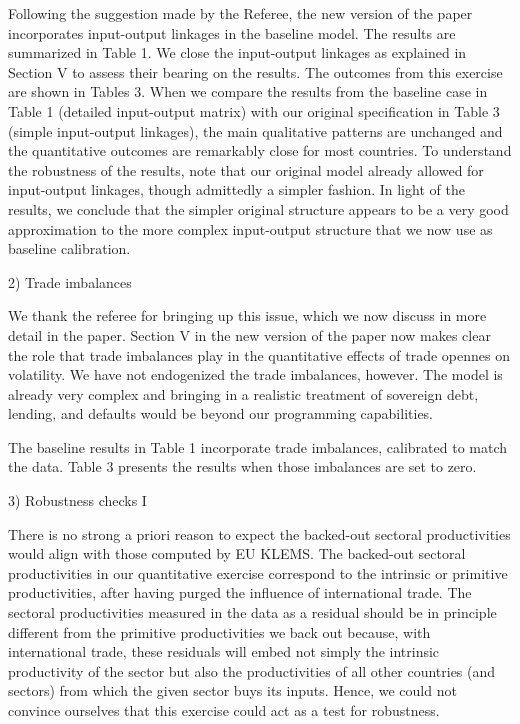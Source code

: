 \documentclass[12pt]{article}
\begin{document}
Following the suggestion made by the Referee, the new version of the paper
incorporates input-output linkages in the baseline model. The results are
summarized in Table 1. We close the input-output linkages as explained in
Section V to assess their bearing on the results. The outcomes from this
exercise are shown in Tables 3. When we compare the results from the
baseline case in Table 1 (detailed input-output matrix) with our original
specification in Table 3 (simple input-output linkages), the main
qualitative patterns are unchanged and the quantitative outcomes are
remarkably close for most countries. To understand the robustness of the
results, note that our original model already allowed for input-output
linkages, though admittedly a simpler fashion. In light of the results, we
conclude that the simpler original structure appears to be a very good
approximation to the more complex input-output structure that we now use as
baseline calibration.\bigskip 

2) Trade imbalances

We thank the referee for bringing up this issue, which we now discuss in
more detail in the paper. Section V in the new version of the paper now
makes clear the role that trade imbalances play in the quantitative effects
of trade opennes on volatility. We have not endogenized the trade
imbalances, however. The model is already very complex and bringing in a
realistic treatment of sovereign debt, lending, and defaults would be beyond
our programming capabilities. 

The baseline results in Table 1 incorporate trade imbalances, calibrated to
match the data. Table 3 presents the results when those imbalances are set
to zero.\bigskip 

3) Robustness checks I

There is no strong a priori reason to expect the backed-out sectoral
productivities would align with those computed by EU KLEMS. The backed-out
sectoral productivities in our quantitative exercise correspond to the
intrinsic or primitive productivities, after having purged the influence of
international trade. The sectoral productivities measured in the data as a
residual should be in principle different from the primitive productivities
we back out because, with international trade, these residuals will embed
not simply the intrinsic productivity of the sector but also the
productivities of all other countries (and sectors) from which the given
sector buys its inputs. Hence, we could not convince ourselves that this
exercise could act as a test for robustness.\bigskip 
\end{document}
